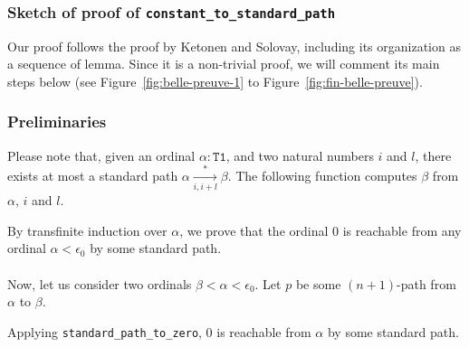 

\subsubsection{Sketch of proof of \texttt{constant\_to\_standard\_path}}

Our proof follows the proof by Ketonen and Solovay, including its organization as a sequence of lemma.  Since it is a non-trivial proof, we will comment its main steps below   (see Figure~\vref{fig:belle-preuve-1} to Figure~\vref{fig:fin-belle-preuve}).

\subsubsection*{Preliminaries}


Please note that, given an ordinal $\alpha:\texttt{T1}$, and two natural numbers $i$ and $l$, there exists at most a standard path $\alpha \xrightarrow [i,i+l]{*} \beta$.
The following function computes $\beta$ from $\alpha$, $i$ and $l$.






By transfinite induction over  $\alpha$, we prove that the ordinal $0$ is reachable from any ordinal $\alpha<\epsilon_0$ by some standard path.




\paragraph*{}
Now, let us consider two ordinals  $\beta<\alpha<\epsilon_0$.  Let $p$  be some $(n+1)$-path from $\alpha$ to $\beta$.




Applying \texttt{standard\_path\_to\_zero}, $0$ is reachable from $\alpha$ by some standard path.

